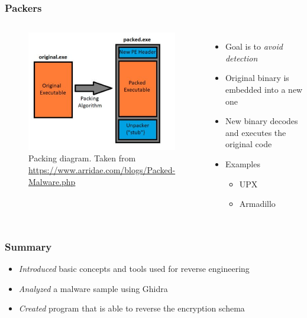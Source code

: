 \documentclass[10pt,xcolor=pdflatex]{beamer}
\begin{document}
\begin{frame}\frametitle{Packers}

  \begin{columns}
    \begin{figure}
      \centering
      \includegraphics[width=.8\textwidth]{../images/packer.jpg}
    \caption{Packing diagram. \tiny Taken from \url{https://www.arridae.com/blogs/Packed-Malware.php}}
    \end{figure}
    \begin{itemize}
        \item Goal is to \emph{avoid detection}
        \hfill
        \item Original binary is embedded into a new one
        \hfill
        \item New binary decodes and executes the original code
        \hfill
        \item Examples
            \begin{itemize}

                \item UPX
                \item Armadillo
                
            \end{itemize}
    \end{itemize}
  \end{columns}

\end{frame}


\begin{frame}\frametitle{Summary}
    \begin{itemize}

        \item \emph{Introduced} basic concepts and tools used for reverse engineering

        \hfill

        \item \emph{Analyzed} a malware sample using Ghidra

        \hfill

        \item \emph{Created} program that is able to reverse the encryption schema
        
    \end{itemize}
\end{frame}
\end{document}
